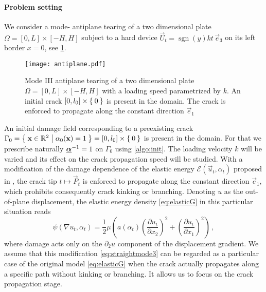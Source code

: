 \paragraph{Problem setting} We consider a mode- antiplane tearing of a two dimensional plate $\Omega=[0,L]\times[-H,H]$ subject to a hard device $\vec{U}_t=\operatorname{sgn}(y)kt\,\vec{e}_3$ on its left border $x=0$, see \cref{fig:antiplane}.
\begin{figure}[htbp]
\centering
\texttt{[image: antiplane.pdf]}
\caption{Mode III antiplane tearing of a two dimensional plate $\Omega=[0,L]\times[-H,H]$ with a loading speed parametrized by $k$. An initial crack $[0,l_0]\times\Set{0}$ is present in the domain. The crack is enforced to propagate along the constant direction $\vec{e}_1$} \label{fig:antiplane}
\end{figure}
An initial damage field corresponding to a preexisting crack $\Gamma_0=\set{\vec{x}\in\mathbb{R}^2|\alpha_0(\vec{x})=1}=[0,l_0]\times\set{0}$ is present in the domain. For that we prescribe naturally $\dvec^{-1}=1$ on $\Gamma_0$ using \cref{algo:init}. The loading velocity $k$ will be varied and its effect on the crack propagation speed will be studied. With a modification of the damage dependence of the elastic energy $\mathcal{E}(\vec{u}_t,\alpha_t)$ proposed in \cite{Bourdin:2011}, the crack tip $t\mapsto\vec{P}_t$ is enforced to propagate along the constant direction $\vec{e}_1$, which prohibits consequently crack kinking or branching. Denoting $u$ as the out-of-plane displacement, the elastic energy density \eqref{eq:elasticG} in this particular situation reads
\begin{equation} \label{eq:straightmode3}
\psi(\nabla u_t,\alpha_t)=\frac{1}{2}\mu\left(a(\alpha_t)\left(\frac{\partial u_t}{\partial x_2}\right)^2+\left(\frac{\partial u_t}{\partial x_1}\right)^2\right)\,,
\end{equation}
where damage acts only on the $\partial_2 u$ component of the displacement gradient. We assume that this modification \eqref{eq:straightmode3} can be regarded as a particular case of the original model \eqref{eq:elasticG} when the crack actually propagates along a specific path without kinking or branching. It allows us to focus on the crack propagation stage.

